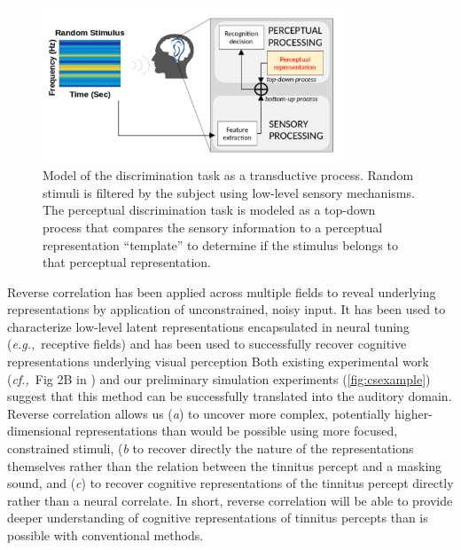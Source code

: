 \documentclass[11pt, notitlepage]{article} %
\def\eg{{\emph{e.g.,}}~}
\def\cf{{\emph{cf.,}}~}
\begin{document}
\begin{figure}[h] %
	\centering
	\includegraphics[width=0.8\textwidth]{Figures/Figures_tinnitus_1.png}
	\caption{Model of the discrimination task as a transductive process.
	Random stimuli is filtered by the subject using low-level sensory mechanisms.
	The perceptual discrimination task is modeled as a top-down process that
	compares the sensory information to a perceptual representation ``template''
	to determine if the stimulus belongs to that perceptual representation.}
	\label{fig:template}
\end{figure}

Reverse correlation has been applied across multiple fields to reveal underlying representations by application of unconstrained, noisy input.
It has been used to characterize low-level latent representations encapsulated in neural tuning
(\eg receptive fields) \cite{ringachReverseCorrelationNeurophysiology2004}
and has been used to successfully recover cognitive representations underlying visual perception \cite{gosselinSuperstitiousPerceptionsReveal2003,}
Both existing experimental work (\cf Fig 2B in \cite{brimijoinInternalRepresentationVowel2013})
and our preliminary simulation experiments (\autoref{fig:csexample}) suggest that this method can be successfully translated
into the auditory domain.
Reverse correlation allows us (\emph{a}) to uncover more complex, potentially higher-dimensional representations
than would be possible using more focused, constrained stimuli,
(\emph{b} to recover directly the nature of the representations themselves rather than the relation
between the tinnitus percept and a masking sound,
and (\emph{c}) to recover cognitive representations of the tinnitus percept directly rather than a neural correlate.
In short, reverse correlation will be able to provide deeper understanding of cognitive representations of tinnitus percepts
than is possible with conventional methods.
\end{document}
